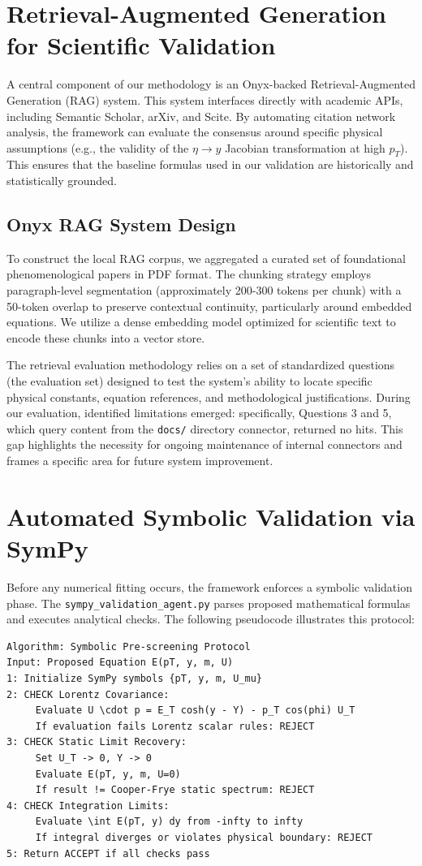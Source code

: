 \section{Retrieval-Augmented Generation for Scientific Validation}
A central component of our methodology is an Onyx-backed Retrieval-Augmented Generation (RAG) system. This system interfaces directly with academic APIs, including Semantic Scholar, arXiv, and Scite. By automating citation network analysis, the framework can evaluate the consensus around specific physical assumptions (e.g., the validity of the $\eta \to y$ Jacobian transformation at high $p_T$). This ensures that the baseline formulas used in our validation are historically and statistically grounded.

\subsection{Onyx RAG System Design}
To construct the local RAG corpus, we aggregated a curated set of foundational phenomenological papers in PDF format. The chunking strategy employs paragraph-level segmentation (approximately 200-300 tokens per chunk) with a 50-token overlap to preserve contextual continuity, particularly around embedded equations. We utilize a dense embedding model optimized for scientific text to encode these chunks into a vector store.

The retrieval evaluation methodology relies on a set of standardized questions (the evaluation set) designed to test the system's ability to locate specific physical constants, equation references, and methodological justifications. During our evaluation, identified limitations emerged: specifically, Questions 3 and 5, which query content from the \texttt{docs/} directory connector, returned no hits. This gap highlights the necessity for ongoing maintenance of internal connectors and frames a specific area for future system improvement.

\section{Automated Symbolic Validation via SymPy}
Before any numerical fitting occurs, the framework enforces a symbolic validation phase. The \texttt{sympy\_validation\_agent.py} parses proposed mathematical formulas and executes analytical checks. The following pseudocode illustrates this protocol:

\begin{verbatim}
Algorithm: Symbolic Pre-screening Protocol
Input: Proposed Equation E(pT, y, m, U)
1: Initialize SymPy symbols {pT, y, m, U_mu}
2: CHECK Lorentz Covariance:
     Evaluate U \cdot p = E_T cosh(y - Y) - p_T cos(phi) U_T
     If evaluation fails Lorentz scalar rules: REJECT
3: CHECK Static Limit Recovery:
     Set U_T -> 0, Y -> 0
     Evaluate E(pT, y, m, U=0)
     If result != Cooper-Frye static spectrum: REJECT
4: CHECK Integration Limits:
     Evaluate \int E(pT, y) dy from -infty to infty
     If integral diverges or violates physical boundary: REJECT
5: Return ACCEPT if all checks pass
\end{verbatim}

